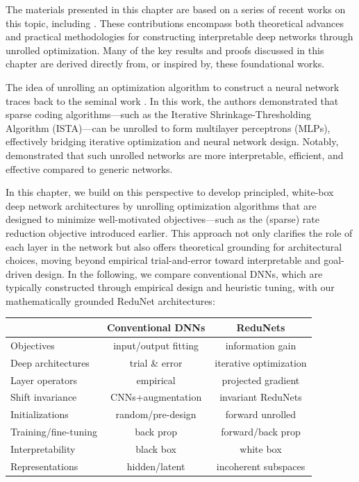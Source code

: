 \documentclass[../../book-main.tex]{subfiles}
\begin{document}
The materials presented in this chapter are based on a series of
recent works on this topic, including \cite{chan2021redunet,
wang2024global, wang2025attention, wu2025token, yu2023white}. These
contributions encompass both theoretical advances and practical
methodologies for constructing interpretable deep networks through
unrolled optimization. Many of the key results and proofs discussed
in this chapter are derived directly from, or inspired by, these
foundational works.

The idea of unrolling an optimization algorithm to construct a neural
network traces back to the seminal work \cite{gregor2010learning}. In
this work, the authors demonstrated that sparse coding
algorithms—such as the Iterative Shrinkage-Thresholding Algorithm
(ISTA)—can be unrolled to form multilayer perceptrons (MLPs),
effectively bridging iterative optimization and neural network
design. Notably, \cite{monga2019algorithm} demonstrated that such
unrolled networks are more interpretable, efficient, and effective
compared to generic networks.

In this chapter, we build on this perspective to develop principled,
white-box deep network architectures by unrolling optimization
algorithms that are designed to minimize well-motivated
objectives—such as the (sparse) rate reduction objective introduced
earlier. This approach not only clarifies the role of each layer in
the network but also offers theoretical grounding for architectural
choices, moving beyond empirical trial-and-error toward interpretable
and goal-driven design.  In the following, we compare conventional
DNNs, which are typically constructed through empirical design and
heuristic tuning, with our mathematically grounded ReduNet architectures:

\begin{center}
    \begin{tabular}{| l || c | c |}
        \hline
        & Conventional DNNs & ReduNets\\ [0.5ex]
        \hline \hline
        Objectives & input/output fitting & information gain\\ [0.5ex]
        \hline
        Deep architectures & trial \& error & iterative optimization \\  [0.5ex]
        \hline
        Layer operators & empirical & projected gradient \\  [0.5ex]
        \hline
        Shift invariance & CNNs+augmentation & invariant ReduNets \\  [0.5ex]
        \hline
        Initializations & random/pre-design & forward unrolled \\ [0.5ex]
        \hline
        Training/fine-tuning & back prop & forward/back prop\\ [0.5ex]
        \hline
        Interpretability & black box & white box \\ [0.5ex]
        \hline
        Representations & hidden/latent & incoherent subspaces \\ [0.5ex]
        \hline
    \end{tabular}
\end{center}
\end{document}
